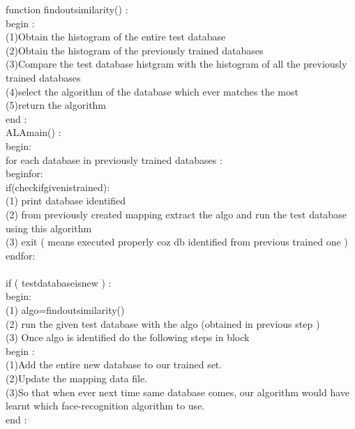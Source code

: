 \documentclass[10pt,a4paper]{article}
\begin{document}
function findoutsimilarity() : \\
begin : \\
\tab 	(1)Obtain the histogram of the entire test database \\
\tab	(2)Obtain the histogram of the previously trained databases \\
\tab	(3)Compare the test database histgram with the histogram of all the \tab previously trained databases \\
\tab	(4)select the algorithm of the database which ever matches the most \\
\tab	(5)return the algorithm \\
end : \\

ALAmain() : \\
begin: \\
\tab  for each database in previously trained databases : \\
\tab \tab beginfor:\\
\tab \tab   if(checkifgivenistrained): \\
\tab \tab \tab (1) print database identified \\ 
\tab \tab \tab (2) from previously created mapping extract the algo \tab \tab \tab  and run the test database using this algorithm \\
\tab \tab \tab (3) exit ( means executed properly coz db identified \tab \tab \tab from previous trained one ) \\
\tab \tab endfor:\\
\\
\tab if ( testdatabaseisnew ) : \\
\tab begin: \\
\tab \tab (1) algo=findoutsimilarity() \\
\tab \tab (2) run the given test database with the algo (obtained in \tab \tab previous step ) \\
\tab \tab (3) Once algo is identified do the following steps in block \\
\tab \tab begin : \\
\tab \tab \tab (1)Add the entire new database to our trained set.  \\
\tab \tab \tab (2)Update the mapping data file. \\
\tab \tab \tab (3)So that when ever next time same database comes, \tab \tab \tab our algorithm would have learnt which face-recognition \tab \tab \tab algorithm to use. \\
\tab \tab end : \\
\end{document}
